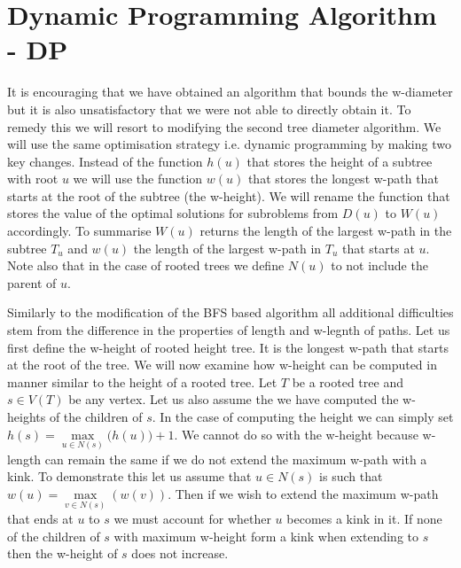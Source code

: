 
\section{Dynamic Programming Algorithm - DP}

It is encouraging that we have obtained an algorithm that bounds the w-diameter but it is also unsatisfactory that we were not able to directly obtain it. To remedy this we will resort to modifying the second tree diameter algorithm. We will use the same optimisation strategy i.e. dynamic programming by making two key changes. Instead of the function $h(u)$ that stores the height of a subtree with root $u$ we will use the function $w(u)$ that stores the longest w-path that starts at the root of the subtree (the w-height). We will rename the function that stores the value of the optimal solutions for subroblems from $D(u)$ to $W(u)$ accordingly. To summarise $W(u)$ returns the length of the largest w-path in the subtree $T_u$ and $w(u)$ the length of the largest w-path in $T_u$ that starts at $u$. Note also that in the case of rooted trees we define $N(u)$ to not include the parent of $u$.

Similarly to the modification of the BFS based algorithm all additional difficulties stem from the difference in the properties of length and w-legnth of paths. Let us first define the w-height of rooted height tree. It is the longest w-path that starts at the root of the tree. We will now examine how w-height can be computed in manner similar to the height of a rooted tree. Let $T$ be a rooted tree and $s \in V(T)$ be any vertex. Let us also assume the we have computed the w-heights of the children of $s$. In the case of computing the height we can simply set $h(s) = \max\limits_{u \in N(s)}\big( h(u) \big) + 1$. We cannot do so with the w-height because w-length can remain the same if we do not extend the maximum w-path with a kink.  To demonstrate this let us assume that $u \in N(s)$ is such that $w(u) = \max\limits_{v \in N(s)}(w(v))$. Then if we wish to extend the maximum w-path that ends at $u$ to $s$ we must account for whether $u$ becomes a kink in it. If none of the children of $s$ with maximum w-height form a kink when extending to $s$ then the w-height of $s$ does not increase.

